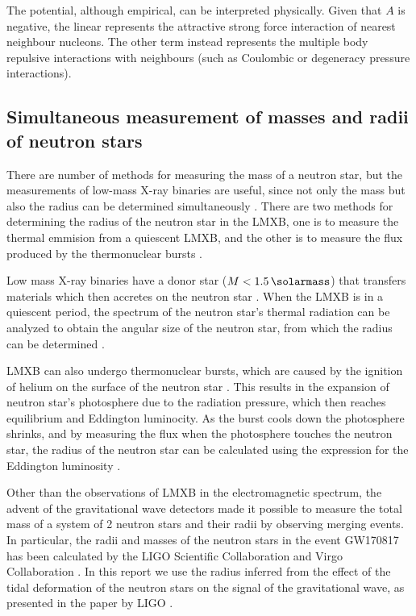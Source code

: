 \documentclass[draft,11pt]{article}
\theoremstyle{definition}
\theoremstyle{remark}
\begin{document}
                The potential, although empirical, can be interpreted physically. Given that $A$ is negative, the linear represents the attractive strong force interaction of nearest neighbour nucleons. The other term instead represents the multiple body repulsive interactions with neighbours \parencite{bludman.dover.1980/extrapolation.skyrme.eos} (such as Coulombic or degeneracy pressure interactions).
            
        \subsection{Simultaneous measurement of masses and radii of neutron stars}
            There are number of methods for measuring the mass of a neutron star, but the measurements of low-mass X-ray binaries are useful, since not only the mass but also the radius can be determined simultaneously \parencite{ozel.paulo.2016/masses.radii.eos}. There are two methods for determining the radius of the neutron star in the LMXB, one is to measure the thermal emmision from a quiescent LMXB, and the other is to measure the flux produced by the thermonuclear bursts \parencite{ozel.paulo.2016/masses.radii.eos}.
            
            Low mass X-ray binaries have a donor star ($M<\SI{1.5}{\solarmass}$) that transfers materials which then accretes on the neutron star \parencite{tauris.2003/xray.binary}. When the LMXB is in a quiescent period, the spectrum of the neutron star's thermal radiation can be analyzed to obtain the angular size of the neutron star, from which the radius can be determined \parencite{ozel.psaltis.2016/radius.oberve}.
            
            LMXB can also undergo thermonuclear bursts, which are caused by the ignition of helium on the surface of the neutron star \parencite{ozel.paulo.2016/masses.radii.eos}. This results in the expansion of neutron star's photosphere due to the radiation pressure, which then reaches equilibrium and Eddington luminocity. As the burst cools down the photosphere shrinks, and by measuring the flux when the photosphere touches the neutron star, the radius of the neutron star can be calculated using the expression for the Eddington luminosity \parencite{ozel.psaltis.2016/radius.oberve}.
            
           Other than the observations of LMXB in the electromagnetic spectrum, the advent of the gravitational wave detectors made it possible to measure the total mass of a system of 2 neutron stars and their radii by observing merging events. In particular, the  radii and masses of the neutron stars in the event GW170817 has been calculated by the LIGO Scientific Collaboration and Virgo Collaboration \cite{ligo.virgo.2019/prop.of.ns.merger.GW170817,ligo.virgo.2018/GW170817.ns.radii}. In this report we use the radius inferred from the effect of the tidal deformation of the neutron stars on the signal of the gravitational wave, as presented in the paper by LIGO \cite{ligo.virgo.2018/GW170817.ns.radii}.
    
\end{document}

